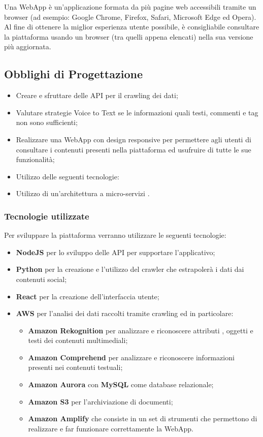 Una WebApp \glo{} è un'applicazione formata da più pagine web accessibili tramite un browser (ad esempio: Google Chrome, Firefox, Safari, Microsoft Edge ed Opera). Al fine di ottenere la miglior esperienza utente possibile, è consigliabile consultare la piattaforma usando un browser (tra quelli appena elencati) nella sua versione più aggiornata.

\subsection{Obblighi di Progettazione}


\begin{itemize}
  \item Creare e sfruttare delle API \glo per il crawling \glo dei dati;
  \item Valutare strategie Voice to Text se le informazioni quali testi, commenti e tag non sono sufficienti;
  \item Realizzare una WebApp \glo con design responsive per permettere agli utenti di consultare i contenuti presenti nella piattaforma ed usufruire di tutte le sue funzionalità;
  \item Utilizzo delle seguenti tecnologie: 
  \item Utilizzo di un'architettura a micro-servizi \glo{}.
\end{itemize}

\subsubsection{Tecnologie utilizzate}

Per sviluppare la piattaforma verranno utilizzare le seguenti tecnologie:
\begin{itemize}
    \item \textbf{NodeJS} \glo{} per lo sviluppo delle API \glo{} per supportare l’applicativo;
    \item \textbf{Python} per la creazione e l'utilizzo del crawler che estrapolerà i dati dai contenuti social;
    \item \textbf{React} per la creazione dell'interfaccia utente;
    \item \textbf{AWS} \glo{} per l'analisi dei dati raccolti tramite crawling \glo{} ed in particolare:
    \begin{itemize}
    	\item \textbf{Amazon Rekognition} per analizzare e riconoscere attributi \glo{}, oggetti e testi dei contenuti multimediali;
    	\item \textbf{Amazon Comprehend} per analizzare e riconoscere informazioni presenti nei contenuti testuali;
    	\item \textbf{Amazon Aurora} con \textbf{MySQL} come database relazionale;
    	\item \textbf{Amazon S3} per l'archiviazione di documenti;
    	\item \textbf{Amazon Amplify} che consiste in un set di strumenti che permettono di realizzare e far funzionare correttamente la WebApp.
	\end{itemize}
  \end{itemize}